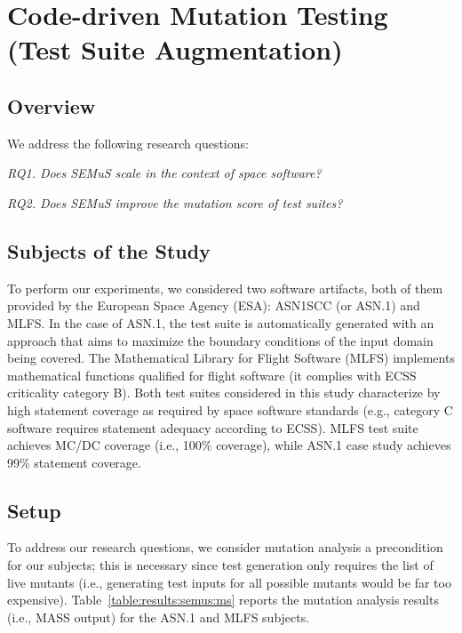 \clearpage
\section{Code-driven Mutation Testing (Test Suite Augmentation)}
\label{sec:testGeneration:codeDriven}

\subsection{Overview}

We address the following research questions:

\emph{RQ1. Does SEMuS scale in the context of space software?}

\emph{RQ2. Does SEMuS improve the mutation score of test suites?}

\subsection{Subjects of the Study}

To perform our experiments, we considered two software artifacts, both of them provided by the European Space Agency (ESA): ASN1SCC (or ASN.1) and MLFS.
In the case of ASN.1, the test suite is automatically generated with an approach that aims to maximize the boundary conditions of the input domain being covered. 
The Mathematical Library for Flight Software (MLFS) implements mathematical functions qualified for flight software (it complies with ECSS criticality category B).
Both test suites considered in this study characterize by high statement coverage as required by space software standards (e.g., category C software requires statement adequacy according to ECSS). MLFS test suite achieves MC/DC coverage (i.e., 100\% coverage), while ASN.1 case study achieves 99\% statement coverage.

\subsection{Setup}

To address our research questions, we consider mutation analysis a precondition for our subjects; this is necessary since test generation only requires the list of live mutants (i.e., generating test inputs for all possible mutants would be far too expensive). Table~\ref{table:results:semus:ms} reports the mutation analysis results (i.e., MASS output) for the ASN.1 and MLFS subjects.

